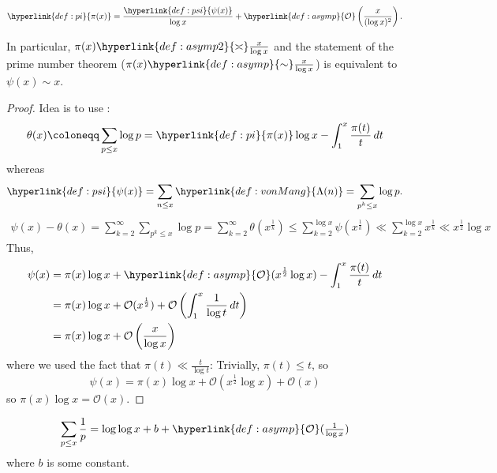 \documentclass{article}
\newcommand{\1}{\mathbbm{1}}
\newcommand{\bigO}{\mathcal{O}}
\begin{document}
\begin{nlemma}\label{lem:8}
  \newlec
  \begin{equation*}
    \hyperlink{def:pi}{\pi(x)} = \frac{\hyperlink{def:psi}{\psi(x)}}{\log x} + \hyperlink{def:asymp}{\bigO}\left(\frac{x}{(\log x)^2}\right).
  \end{equation*}
\end{nlemma}
In particular, $\pi(x) \hyperlink{def:asymp2}{\asymp} \frac{x}{\log x}$ and the statement of the prime number theorem ($\pi(x) \hyperlink{def:asymp}{\sim} \frac{x}{\log x}$) is equivalent to $\psi(x) \sim x$.
\begin{proof}
  Idea is to use :
  \begin{equation*}
    \theta(x) \coloneqq \sum_{p \leq x} \log p = \hyperlink{def:pi}{\pi(x)} \log x - \int_1^x \frac{\pi(t)}{t} \, dt
  \end{equation*}
  whereas
  \begin{equation*}\hyperlink{def:psi}{\psi(x)} = \sum_{n \leq x} \hyperlink{def:vonMang}{\Lambda(n)} = \sum_{p^k \leq x} \log p.\end{equation*}
  \begin{align*}
    \psi(x) - \theta(x) = \sum_{k=2}^\infty \sum_{p^k \leq x} \log p = \sum_{k=2}^\infty \theta(x^{\frac{1}{k}}) \leq \sum_{k=2}^{\log x} \psi(x^{\frac{1}{k}}) \ll \sum_{k=2}^{\log x} x^{\frac{1}{k}} \ll x^{\frac{1}{2}} \log x
  \end{align*}
  Thus,
  \begin{align*}
    \psi(x) &= \pi(x) \log x + \hyperlink{def:asymp}{\bigO}(x^{\frac{1}{2}} \log x) - \int_1^x \frac{\pi(t)}{t} \, dt \\
            &= \pi(x) \log x + \bigO(x^{\frac{1}{2}}) + \bigO\left(\int_1^x \frac{1}{\log t} \, dt\right) \\
            &= \pi(x) \log x + \bigO\left(\frac{x}{\log x}\right)
  \end{align*}
  where we used the fact that $\pi(t) \ll \frac{t}{\log t}$:
  Trivially, $\pi(t) \leq t$, so
  \begin{equation*}
    \psi(x) = \pi(x) \log x + \bigO(x^{\frac{1}{2}} \log x) + \bigO(x)
  \end{equation*}
  so $\pi(x) \log x = \bigO(x)$.
\end{proof}
\begin{nlemma}\label{lem:9}
  \begin{equation*}
    \sum_{p \leq x} \frac{1}{p} = \log \log x + b + \hyperlink{def:asymp}{\bigO}(\tfrac{1}{\log x})
  \end{equation*}
  where $b$ is some constant.
\end{nlemma}
\end{document}
